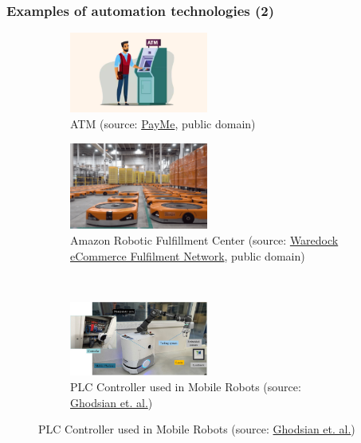 \begin{frame}
	\frametitle{Examples of automation technologies (2)}
	\begin{figure}
		\centering
		\begin{subfigure}[b]{0.49\textwidth}
			\centering
			\includegraphics[width=0.5\textwidth]{fig/lec01/ATM}
			\caption{ATM (source: \href{https://www.paymeindia.in/blog/wp-content/uploads/2025/02/what-is-an-atm-1024x597.jpg}{PayMe}, public domain)}
		\end{subfigure}
		\hfill
		\begin{subfigure}[b]{0.49\textwidth}
			\centering
			\includegraphics[width=0.5\textwidth]{fig/lec01/Amazon.png}
			\caption{Amazon Robotic Fulfillment Center (source: \href{https://www.waredock.com/wp-content/uploads/2019/08/Screenshot-2019-08-01-at-22.50.57-768x481.png}{Waredock eCommerce Fulfilment Network}, public domain)}
		\end{subfigure}
		\\
		\begin{subfigure}[b]{0.49\textwidth}
			\centering
			\includegraphics[width=0.5\textwidth]{fig/lec01/PLC.jpg}
			\caption{PLC Controller used in Mobile 
Robots (source: \href{https://doi.org/10.1016/j.robot.2023.104526}{Ghodsian et. al.})}
		\end{subfigure}

\end{figure}
\end{frame}
